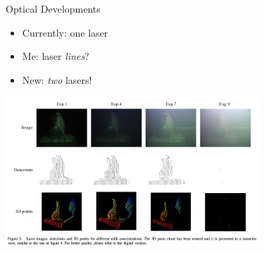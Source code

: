\begin{frame}{Optical Developments}
    \centering
    \begin{itemize}
        \item Currently: one laser
        \item Me: laser \textit{lines}?
        \item New: \textit{two} lasers!
    \end{itemize}
    \includegraphics[height=0.6\textheight, width=0.7125\textwidth, keepaspectratio]{images/laser_line_examples.png}
\end{frame}